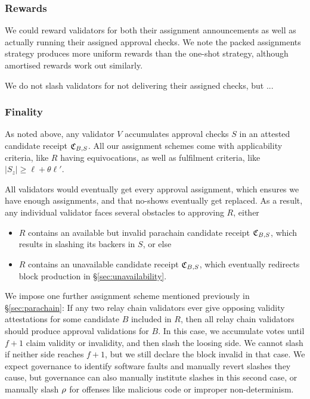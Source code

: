 \subsubsection{Rewards}

We could reward validators for both their assignment announcements as well as actually running their assigned approval checks.  We note the packed assignments strategy produces more uniform rewards than the one-shot strategy, although amortised rewards work out similarly.  

We do not slash validators for not delivering their assigned checks, but ... 


\subsubsection{Finality} 
\label{sec:finality}

As noted above, any validator $V$ accumulates approval checks $S$ in an attested candidate receipt $\mathfrak{C}_{B,S}$.  All our assignment schemes come with applicability criteria, like $R$ having equivocations, as well as fulfilment criteria, like $|S_z| \ge \ell + \theta \ell'$.  

All validators would eventually get every approval assignment, which ensures we have enough assignments, and that no-shows eventually get replaced.  As a result, any individual validator faces several obstacles to approving $R$, either
\begin{itemize}
\item $R$ contains an available but invalid parachain candidate receipt $\mathfrak{C}_{B,S}$, which results in slashing its backers in $S$, or else
\item $R$ contains an unavailable candidate receipt $\mathfrak{C}_{B,S}$, which eventually redirects block production in \S\ref{sec:unavailability}. 
\end{itemize}

We impose one further assignment scheme mentioned previously in \S\ref{sec:parachain}:  If any two relay chain validators ever give opposing validity attestations for some candidate $B$ included in $R$, then all relay chain validators should produce approval validations for $B$.  In this case, we accumulate votes until $f+1$ claim validity or invalidity, and then slash the loosing side.  We cannot slash if neither side reaches $f+1$, but we still declare the block invalid in that case.  We expect governance to identify software faults and manually revert slashes they cause, but governance can also manually institute slashes in this second case, or manually slash $\rho$ for offenses like malicious code or improper non-determinism. 

